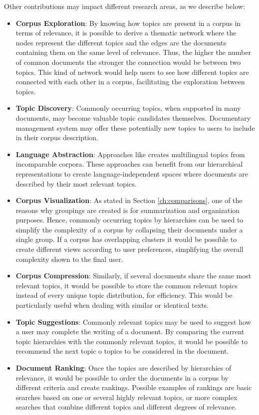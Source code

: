 Other contributions may impact different research areas, as we describe below:
\begin{itemize}
\item \textbf{Corpus Exploration}: By knowing how topics are present in a corpus in terms of relevance, it is possible to derive a thematic network where the nodes represent the different topics and the edges are the documents containing them on the same level of relevance. Thus, the higher the number of common documents the stronger the connection would be between two topics. This kind of network would help users to see how different topics are connected with each other in a corpus, facilitating the exploration between topics.
\item \textbf{Topic Discovery}: Commonly occurring topics, when supported in many documents, may become valuable topic candidates themselves. Documentary management system may offer these potentially new topics to users to include in their corpus description.
\item \textbf{Language Abstraction}: Approaches like \citep{hao-paul-2018-learning} creates multilingual topics from incomparable corpora. These approaches can benefit from our hierarchical representations to create language-independent spaces where documents are described by their most relevant topics.
\item \textbf{Corpus Visualization}: As stated in Section \ref{ch:comparisons}, one of the reasons why groupings are created is for summarization and organization purposes. Hence, commonly occurring topics by hierarchies can be used to simplify the complexity of a corpus by collapsing their documents under a single group. If a corpus has overlapping clusters it would be possible to create different views according to user preferences, simplifying the overall complexity shown to the final user.
\item \textbf{Corpus Compression}: Similarly, if several documents share the same most relevant topics, it would be possible to store the common relevant topics instead of every unique topic distribution, for efficiency. This would be particularly useful when dealing with similar or identical texts.
\item \textbf{Topic Suggestions}: Commonly relevant topics may be used to suggest how a user may complete the writing of a document. By comparing the current topic hierarchies with the commonly relevant topics, it would be possible to recommend the next topic o topics to be considered in the document.
\item \textbf{Document Ranking}: Once the topics are described by hierarchies of relevance, it would be possible to order the documents in a corpus by different criteria and create rankings. Possible examples of rankings are basic searches based on one or several highly relevant topics, or more complex searches that combine different topics and different degrees of relevance.  
\end{itemize}

